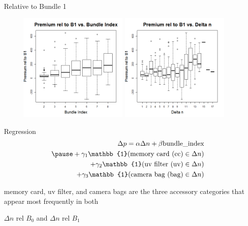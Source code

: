 \documentclass[xcolor=dvipsnames,12pt]{beamer}
\theoremstyle{definition}
\begin{document}
\begin{frame}{Relative to Bundle 1}
\begin{figure}

\graphicspath{ {../../1_relative_to_bundle_1/} }
\includegraphics[width=0.475\textwidth]{6_boxplot_bundle_index_prem_rel_to_bundle_1}
\hfill
%
%
\includegraphics[width=0.475\textwidth]{7_boxplot_delta_n_prem_rel_to_bundle_1}
\end{figure}
\end{frame}

\begin{frame}{Regression}
\begin{align*} \Delta p = \alpha \Delta n + \beta \text{bundle\_index}\\ \pause
 +\gamma_1 \mathbb{1}(\text{memory card (cc)} \in \Delta n) \\
+ \gamma_2 \mathbb{1}(\text{uv filter (uv)} \in \Delta n) \\
+ \gamma_3  \mathbb{1}(\text{camera bag (bag)} \in \Delta n)
\end{align*}
\medskip
\pause

memory card, uv filter, and camera bags are the three accessory categories that appear most frequently in both 

$\Delta n$ rel $B_0$ and $\Delta n$ rel $B_1$
\end{frame}
\end{document}
